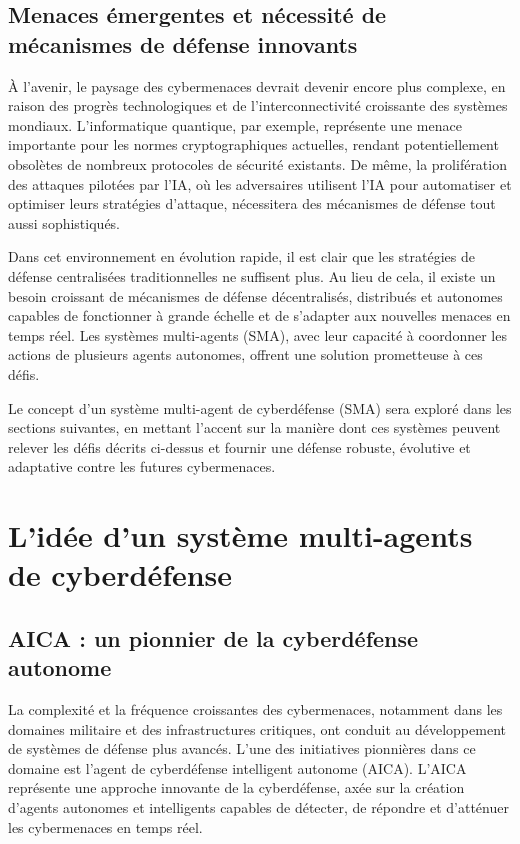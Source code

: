 \subsection{Menaces émergentes et nécessité de mécanismes de défense innovants}

À l’avenir, le paysage des cybermenaces devrait devenir encore plus complexe, en raison des progrès technologiques et de l’interconnectivité croissante des systèmes mondiaux. L’informatique quantique, par exemple, représente une menace importante pour les normes cryptographiques actuelles, rendant potentiellement obsolètes de nombreux protocoles de sécurité existants\cite{mosca2018cybersecurity}\cite{bernstein2017post}. De même, la prolifération des attaques pilotées par l’IA, où les adversaires utilisent l’IA pour automatiser et optimiser leurs stratégies d’attaque, nécessitera des mécanismes de défense tout aussi sophistiqués\cite{brundage2018malicious}.

Dans cet environnement en évolution rapide, il est clair que les stratégies de défense centralisées traditionnelles ne suffisent plus. Au lieu de cela, il existe un besoin croissant de mécanismes de défense décentralisés, distribués et autonomes capables de fonctionner à grande échelle et de s'adapter aux nouvelles menaces en temps réel. Les systèmes multi-agents (SMA), avec leur capacité à coordonner les actions de plusieurs agents autonomes, offrent une solution prometteuse à ces défis.

Le concept d'un système multi-agent de cyberdéfense (SMA) sera exploré dans les sections suivantes, en mettant l'accent sur la manière dont ces systèmes peuvent relever les défis décrits ci-dessus et fournir une défense robuste, évolutive et adaptative contre les futures cybermenaces.


\section{L'idée d'un système multi-agents de cyberdéfense}

\subsection{AICA : un pionnier de la cyberdéfense autonome}

La complexité et la fréquence croissantes des cybermenaces, notamment dans les domaines militaire et des infrastructures critiques, ont conduit au développement de systèmes de défense plus avancés. L'une des initiatives pionnières dans ce domaine est l'agent de cyberdéfense intelligent autonome (AICA). L'AICA représente une approche innovante de la cyberdéfense, axée sur la création d'agents autonomes et intelligents capables de détecter, de répondre et d'atténuer les cybermenaces en temps réel.

